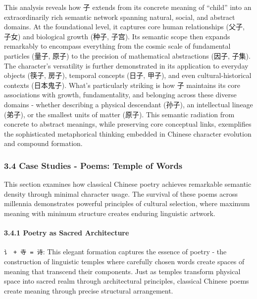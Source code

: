 \documentclass[
  11pt,
  letterpaper,
]{article}
\begin{document}
This analysis reveals how 子 extends from its concrete meaning of
``child'' into an extraordinarily rich semantic network spanning
natural, social, and abstract domains. At the foundational level, it
captures core human relationships (父子, 子女) and biological growth
(种子, 子宫). Its semantic scope then expands remarkably to encompass
everything from the cosmic scale of fundamental particles (量子, 原子)
to the precision of mathematical abstractions (因子, 子集). The
character's versatility is further demonstrated in its application to
everyday objects (筷子, 房子), temporal concepts (日子, 甲子), and even
cultural-historical contexts (日本鬼子). What's particularly striking is
how 子 maintains its core associations with growth, fundamentality, and
belonging across these diverse domains - whether describing a physical
descendant (孙子), an intellectual lineage (弟子), or the smallest units
of matter (原子). This semantic radiation from concrete to abstract
meanings, while preserving core conceptual links, exemplifies the
sophisticated metaphorical thinking embedded in Chinese character
evolution and compound formation.

\subsubsection{3.4 Case Studies - Poems: Temple of
Words}\label{case-studies---poems-temple-of-words}

This section examines how classical Chinese poetry achieves remarkable
semantic density through minimal character usage. The survival of these
poems across millennia demonstrates powerful principles of cultural
selection, where maximum meaning with minimum structure creates enduring
linguistic artwork.

\paragraph{3.4.1 Poetry as Sacred
Architecture}\label{poetry-as-sacred-architecture}

\texttt{讠\ +\ 寺\ =\ 诗}: This elegant formation captures the essence
of poetry - the construction of linguistic temples where carefully
chosen words create spaces of meaning that transcend their components.
Just as temples transform physical space into sacred realm through
architectural principles, classical Chinese poems create meaning through
precise structural arrangement.
\end{document}
